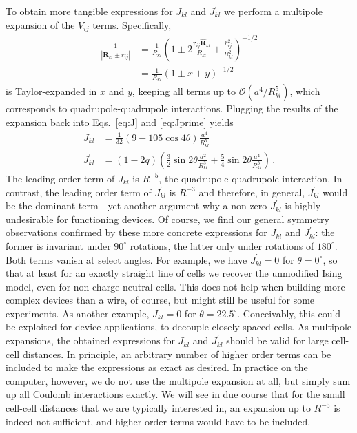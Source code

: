 To obtain more tangible expressions for $J_{kl}$ and $J^{\prime}_{kl}$ we
perform a multipole expansion of the $V_{ij}$ terms. Specifically,
%
\begin{equation}
\begin{split}
  \frac{1}{\left| \bm{R}_{kl} \pm r_{ij} \right|}
  &=
  \frac{1}{R_{kl}}
  \left( 
  1 \pm 2 \frac{\bm{r}_{ij} \hat{\bm{R}}_{kl}}{R_{kl}} + \frac{r_{ij}^2}{R_{kl}^2}
  \right)^{-1/2} \\
  &=
  \frac{1}{R_{kl}} \left( 1 \pm x + y \right)^{-1/2}
\end{split}
\end{equation}
%
is Taylor-expanded in $x$ and $y$, keeping all terms up to
$\mathcal{O}\left(a^4 / R_{kl}^5\right)$, which corresponds to
quadrupole-quadrupole interactions. Plugging the results of the expansion back
into Eqs.~\eqref{eq:J} and \eqref{eq:Jprime} yields
%
\begin{align}
  \label{eq:J_}
  J_{kl}
  &=
  \frac{ 1 }{ 32 }
  \left(
    9 - 105 \cos{4 \theta}
  \right)
  \frac{ a^4 }{ R_{kl}^5 }
  \\
  \label{eq:Jprime_}
  J^{\prime}_{kl}
  &=
  \left( 1 - 2 q \right)
  \left(
    \frac{ 3 }{ 2 } \sin{2 \theta} \frac{ a^2 }{ R_{kl}^3 } +
    \frac{ 5 }{ 4 } \sin{2 \theta} \frac{ a^4 }{ R_{kl}^5 }
  \right) \, .
\end{align}
%
The leading order term of $J_{kl}$ is $R^{-5}$, the quadrupole-quadrupole
interaction. In contrast, the leading order term of $J^{\prime}_{kl}$ is
$R^{-3}$ and therefore, in general, $J^{\prime}_{kl}$ would be the dominant
term---yet another argument why a non-zero $J^{\prime}_{kl}$ is highly
undesirable for functioning  devices. Of course, we find our general
symmetry observations confirmed by these more concrete expressions for $J_{kl}$
and $J^{\prime}_{kl}$: the former is invariant under $90^{\circ}$ rotations, the
latter only under rotations of $180^{\circ}$. Both terms vanish at select
angles. For example, we have $J^{\prime}_{kl} = 0$ for $\theta = 0^{\circ}$, so
that at least for an exactly straight line of cells we recover the unmodified
Ising model, even for non-charge-neutral cells. This does not help when building
more complex devices than a wire, of course, but might still be useful for some
experiments. As another example, $J_{kl} = 0$ for $\theta = 22.5^{\circ}$.
Conceivably, this could be exploited for device applications, to decouple
closely spaced cells. As multipole expansions, the obtained expressions for
$J_{kl}$ and $J^{\prime}_{kl}$ should be valid for large cell-cell distances. In
principle, an arbitrary number of higher order terms can be included to make the
expressions as exact as desired. In practice on the computer, however, we do not
use the multipole expansion at all, but simply sum up all Coulomb interactions
exactly. We will see in due course that for the small cell-cell distances that
we are typically interested in, an expansion up to $R^{-5}$ is indeed not
sufficient, and higher order terms would have to be included.

